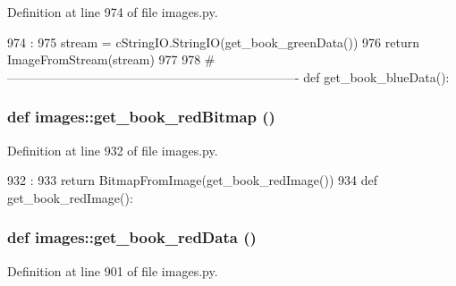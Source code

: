 Definition at line 974 of file images.py.


\begin{DoxyCode}
974                          :
975     stream = cStringIO.StringIO(get_book_greenData())
976     return ImageFromStream(stream)
977 
978 #----------------------------------------------------------------------
def get_book_blueData():
\end{DoxyCode}
\hypertarget{namespaceimages_a161528173597fb1e6af175657d2fe859}{
\subsubsection[{get\_\-book\_\-redBitmap}]{\setlength{\rightskip}{0pt plus 5cm}def images::get\_\-book\_\-redBitmap ()}}
\label{namespaceimages_a161528173597fb1e6af175657d2fe859}


Definition at line 932 of file images.py.


\begin{DoxyCode}
932                         :
933     return BitmapFromImage(get_book_redImage())
934 
def get_book_redImage():
\end{DoxyCode}
\hypertarget{namespaceimages_a5cc41b7333c044a8e3ff244a60f83731}{
\subsubsection[{get\_\-book\_\-redData}]{\setlength{\rightskip}{0pt plus 5cm}def images::get\_\-book\_\-redData ()}}
\label{namespaceimages_a5cc41b7333c044a8e3ff244a60f83731}


Definition at line 901 of file images.py.


